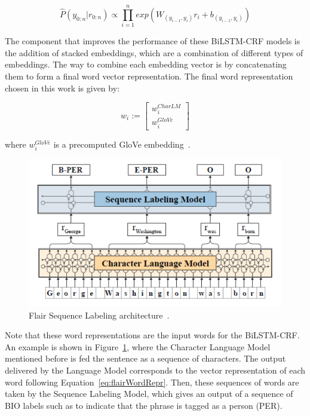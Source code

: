 \[
    \widehat{P}(y_{0:n}|r_{0:n})\propto \prod_{i=1}^n exp(W_{(y_{i-1},y_i)} r_i +b_{(y_{i-1},y_i)})
\]

The component that improves the performance of these BiLSTM-CRF models is the addition of 
stacked embeddings, which are a combination of different types of embeddings. The way to combine 
each embedding vector is by concatenating them to form a final word vector representation. The 
final word representation chosen in this work is given by:

\begin{equation} \label{eq:flairWordRepr}
    w_i := \begin{bmatrix} w_i^{CharLM} \\ w_i^{GloVe} \end{bmatrix}
\end{equation}

\noindent where $w_i^{GloVe}$ is a precomputed GloVe embedding~\cite{seqlab:PenningtonSM14}. 

\begin{figure}[!h]
    \centering
    \includegraphics[scale=.5]{imagenes/2_theorical_framework/information_extraction/sequenceLabelingModel.PNG}
    \caption{Flair Sequence Labeling architecture~\cite{seqlab:flair-AkbikBBRSV19}.}
    \label{fig:flairArchitecture}
\end{figure}

Note that these word representations are the input words for the BiLSTM-CRF. An example is shown in 
Figure~\ref{fig:flairArchitecture}, where the Character Language Model mentioned before is fed 
the sentence  as a sequence of characters. The output 
delivered by the Language Model corresponds to the vector representation of each word following 
Equation~\ref{eq:flairWordRepr}. Then, these sequences of words are taken by the Sequence 
Labeling Model, which gives an output of a sequence of BIO labels such as to indicate that 
the phrase  is tagged as a person (PER).
